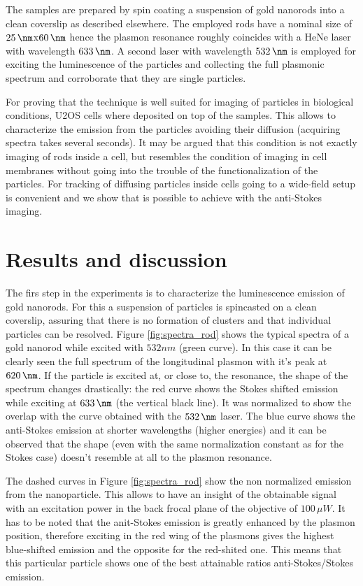 \documentclass[twocolumn]{article}
\begin{document}
The samples are prepared by spin coating a suspension of gold nanorods into a
clean coverslip as described elsewhere. The employed rods have a nominal size of
$25\,\nm$x$60\,\nm$ hence the plasmon resonance roughly coincides with a HeNe
laser with wavelength $633\,\nm$. A second laser with wavelength $532\,\nm$ is
employed for exciting the luminescence of the particles and collecting the full
plasmonic spectrum and corroborate that they are single particles. 

For proving that the technique is well suited for imaging of particles in
biological conditions, U2OS cells where deposited on top of the samples. This
allows to characterize the emission from the particles avoiding their diffusion
(acquiring spectra takes several seconds). It may be argued that this condition
is not exactly imaging of rods inside a cell, but resembles the condition of
imaging in cell membranes without going into the trouble of the
functionalization of the particles. For tracking of diffusing particles inside
cells going to a wide-field setup is convenient and we show that is possible to
achieve with the anti-Stokes imaging. 

\section{Results and discussion}
The firs step in the experiments is to characterize the luminescence emission of
gold nanorods. For this a suspension of particles is spincasted on a clean
coverslip, assuring that there is no formation of clusters and that individual
particles can be resolved. Figure \ref{fig:spectra_rod} shows the typical
spectra of a gold nanorod while excited with $532nm$ (green curve). In this case
it can be clearly seen the full spectrum of the longitudinal plasmon with it's
peak at $620\,\nm$. If the particle is excited at, or close to, the resonance,
the shape of the spectrum changes drastically: the red curve shows the Stokes
shifted emission while exciting at $633\,\nm$ (the vertical black line). It was
normalized to show the overlap with the curve obtained with the $532\,\nm$
laser. The blue curve shows the anti-Stokes emission at shorter wavelengths
(higher energies) and it can be observed that the shape (even with the same
normalization constant as for the Stokes case) doesn't resemble at all to the
plasmon resonance. 

The dashed curves in Figure \ref{fig:spectra_rod} show the non normalized
emission from the nanoparticle. This allows to have an insight of the obtainable
signal with an excitation power in the back frocal plane of the objective of
$100\,\mu W$. It has to be noted that the anit-Stokes emission is greatly
enhanced by the plasmon position, therefore exciting in the red wing of the
plasmons gives the highest blue-shifted emission and the opposite for the
red-shited one. This means that this particular particle shows one of the best
attainable ratios anti-Stokes/Stokes emission. 
\end{document}
